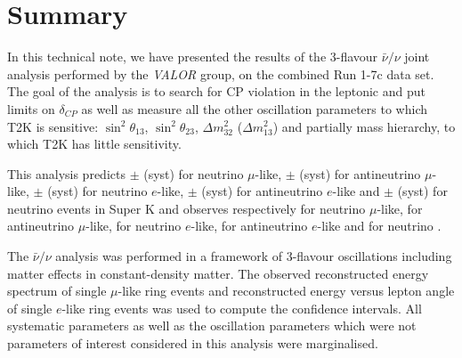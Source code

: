 \clearpage


\section{Summary}
\label{sec:summary}

In this technical note,
we have presented the results of the 3-flavour $\bar{\nu}/\nu$ joint analysis
performed by the {\em VALOR} group,
on the combined Run 1-7c data set.
The goal of the analysis is to search for CP violation in the leptonic
and put limits on $\delta_{CP}$ as well as 
measure all the other oscillation parameters to which T2K is sensitive:
$\sin^2 \theta_{13}$, $\sin^2 \theta_{23}$, $\Delta m^2_{32}$ ($\Delta m^2_{13}$)
and partially mass hierarchy, to which T2K has little sensitivity.

This analysis predicts 
\NskOscExpectationNumuRunOneSevenC{} $\pm$ \NskOscExpectationNumuErrorRunOneSevenC{} (syst) for neutrino $\mu$-like,
\NskOscExpectationNumuBarRunOneSevenC{} $\pm$ \NskOscExpectationNumuBarErrorRunOneSevenC{} (syst) for antineutrino $\mu$-like,
\NskOscExpectationNueRunOneSevenC{} $\pm$ \NskOscExpectationNueErrorRunOneSevenC{} (syst) for neutrino $e$-like,
\NskOscExpectationNueBarRunOneSevenC{} $\pm$ \NskOscExpectationNueBarErrorRunOneSevenC{} (syst) for antineutrino $e$-like
and 
\NskOscExpectationNueCConepiRunOneSevenC{} $\pm$ \NskOscExpectationNueCConepiErrorRunOneSevenC{} (syst) for   neutrino \nueCConepi{}
events in Super K
and observes respectively 
\NskObservedNumuRunOneSevenC{} for neutrino $\mu$-like,
\NskObservedNumuBarRunOneSevenC{}  for antineutrino $\mu$-like,
\NskObservedNueRunOneSevenC{}  for neutrino $e$-like,
\NskObservedNueBarRunOneSevenC{}  for antineutrino $e$-like
and 
\NskObservedNueCConepiRunOneSevenC for neutrino \nueCConepi{}. 

The $\bar{\nu}/\nu$ analysis was performed
in a framework of 3-flavour oscillations including matter effects in constant-density matter.
The observed reconstructed energy spectrum of single $\mu$-like ring events
and reconstructed energy versus lepton angle of single $e$-like ring events
was used to compute the confidence intervals.
All \NSyst{} systematic parameters as well as the oscillation parameters
which were not parameters of interest considered in this analysis were marginalised.

